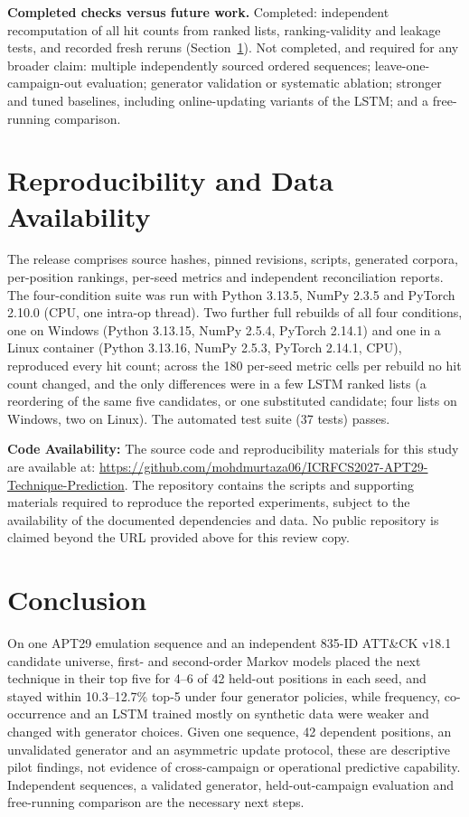 \documentclass[conference]{IEEEtran}
\begin{document}
\textbf{Completed checks versus future work.} Completed: independent recomputation of all hit counts from ranked lists, ranking-validity and leakage tests, and recorded fresh reruns (Section~\ref{sec:repro}). Not completed, and required for any broader claim: multiple independently sourced ordered sequences; leave-one-campaign-out evaluation; generator validation or systematic ablation; stronger and tuned baselines, including online-updating variants of the LSTM; and a free-running comparison.

\section{Reproducibility and Data Availability}
\label{sec:repro}

The release comprises source hashes, pinned revisions, scripts, generated corpora, per-position rankings, per-seed metrics and independent reconciliation reports. The four-condition suite was run with Python 3.13.5, NumPy 2.3.5 and PyTorch 2.10.0 (CPU, one intra-op thread). Two further full rebuilds of all four conditions, one on Windows (Python 3.13.15, NumPy 2.5.4, PyTorch 2.14.1) and one in a Linux container (Python 3.13.16, NumPy 2.5.3, PyTorch 2.14.1, CPU), reproduced every hit count; across the 180 per-seed metric cells per rebuild no hit count changed, and the only differences were in a few LSTM ranked lists (a reordering of the same five candidates, or one substituted candidate; four lists on Windows, two on Linux). The automated test suite (37 tests) passes.

\textbf{Code Availability:} The source code and reproducibility materials for this study are available at: \url{https://github.com/mohdmurtaza06/ICRFCS2027-APT29-Technique-Prediction}. The repository contains the scripts and supporting materials required to reproduce the reported experiments, subject to the availability of the documented dependencies and data. No public repository is claimed beyond the URL provided above for this review copy.

\section{Conclusion}

On one APT29 emulation sequence and an independent 835-ID ATT\&CK v18.1 candidate universe, first- and second-order Markov models placed the next technique in their top five for 4--6 of 42 held-out positions in each seed, and stayed within 10.3--12.7\% top-5 under four generator policies, while frequency, co-occurrence and an LSTM trained mostly on synthetic data were weaker and changed with generator choices. Given one sequence, 42 dependent positions, an unvalidated generator and an asymmetric update protocol, these are descriptive pilot findings, not evidence of cross-campaign or operational predictive capability. Independent sequences, a validated generator, held-out-campaign evaluation and free-running comparison are the necessary next steps.
\end{document}
